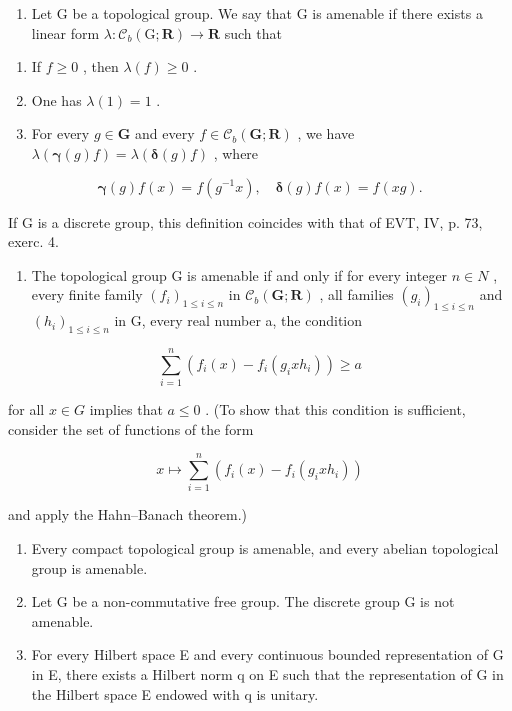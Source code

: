 \begin{enumerate}
\def\labelenumi{\arabic{enumi})}
\setcounter{enumi}{3}
\tightlist
\item
  Let G be a topological group. We say that G is amenable if there exists a linear form \(\lambda\colon\mathcal{C}_{b}(\mathrm{G};\mathbf{R})\to\mathbf{R}\) such that
\end{enumerate}

\begin{enumerate}
\def\labelenumi{(\roman{enumi})}
\item
  If \(f \geqslant 0\) , then \(\lambda(f) \geqslant 0\) .
\item
  One has \(\lambda(1)=1\) .
\item
  For every \(g \in \mathbf{G}\) and every \(f \in \mathcal{C}_b(\mathbf{G};\mathbf{R})\) , we have \(\lambda(\boldsymbol{\gamma}(g)f) = \lambda(\boldsymbol{\delta}(g)f)\) , where
\end{enumerate}

\[
\boldsymbol {\gamma} (g) f (x) = f \left(g ^ {- 1} x\right), \quad \boldsymbol {\delta} (g) f (x) = f (x g).
\]

If G is a discrete group, this definition coincides with that of EVT, IV, p. 73, exerc. 4.

\begin{enumerate}
\def\labelenumi{\alph{enumi})}
\tightlist
\item
  The topological group G is amenable if and only if for every integer \(n \in N\) , every finite family \((f_i)_{1 \leqslant i \leqslant n}\) in \(\mathcal{C}_b(\mathbf{G}; \mathbf{R})\) , all families \((g_i)_{1 \leqslant i \leqslant n}\) and \((h_i)_{1 \leqslant i \leqslant n}\) in G, every real number a, the condition
\end{enumerate}

\[
\sum_ {i = 1} ^ {n} (f _ {i} (x) - f _ {i} (g _ {i} x h _ {i})) \geqslant a
\]

for all \(x \in G\) implies that \(a \leqslant 0\) . (To show that this condition is sufficient, consider the set of functions of the form

\[
x \mapsto \sum_ {i = 1} ^ {n} (f _ {i} (x) - f _ {i} (g _ {i} x h _ {i}))
\]

and apply the Hahn--Banach theorem.)

\begin{enumerate}
\def\labelenumi{\alph{enumi})}
\setcounter{enumi}{1}
\item
  Every compact topological group is amenable, and every abelian topological group is amenable.
\item
  Let G be a non-commutative free group. The discrete group G is not amenable.
\item
  For every Hilbert space E and every continuous bounded representation of G in E, there exists a Hilbert norm q on E such that the representation of G in the Hilbert space E endowed with q is unitary.
\end{enumerate}

